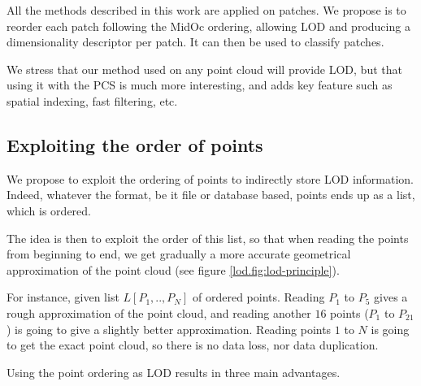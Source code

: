 		All the methods described in this work are applied on patches.
		We propose is to reorder each patch following the MidOc ordering, allowing LOD and producing a dimensionality descriptor per patch. It can then be used to classify patches.
		
		We stress that our method used on any point cloud will provide LOD,
		but that using it with the PCS is much more interesting,
		and adds key feature such as spatial indexing, fast filtering, etc. 
 
 	 
	 	 
	\subsection{Exploiting the order of points}
		\label{lod.method.order}
			
			
			We propose to exploit the ordering of points to indirectly store LOD information.
			Indeed, whatever the format, be it file or database based, points ends up as a list, which is ordered.
			 
			The idea is then to exploit the order of this list, so that when reading the points from beginning to end, we get gradually a more accurate geometrical approximation of the point cloud (see figure \ref{lod.fig:lod-principle}). 
			 
			For instance, given list $L[P_1,..,P_N]$ of ordered points.
			Reading $P_1$ to $P_5$ gives a rough approximation of the point cloud, and reading another $16$ points ($P_1$ to $P_{21}$) is going to give a slightly better approximation. Reading points $1$ to $N$ is going to get the exact point cloud, so there is no data loss, nor data duplication.
		 
			Using the point ordering as LOD results in three main advantages.
